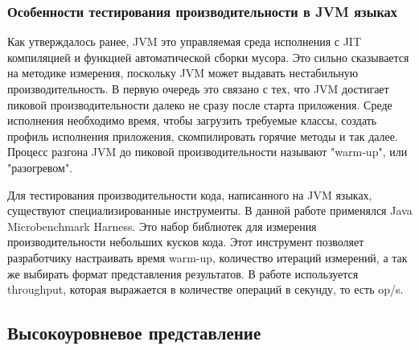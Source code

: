\subsubsection{Особенности тестирования производительности в JVM языках}
Как утверждалось ранее, JVM это управляемая среда исполнения с JIT компиляцией и функцией автоматической сборки мусора. Это сильно сказывается на методике измерения, поскольку JVM может выдавать нестабильную производительность. 
В первую очередь это связано с тех, что JVM достигает пиковой производительности далеко не сразу после старта приложения. Среде исполнения необходимо время, чтобы загрузить требуемые классы, создать профиль исполнения приложения, скомпилировать горячие методы и так далее.
Процесс разгона JVM до пиковой производительности называют "warm-up", или "разогревом".
\par
Для тестирования производительности кода, написанного на JVM языках, существуют специализированные инструменты. 
В данной работе применялся Java Microbenchmark Harness\cite{jmh}. Это набор библиотек для измерения производительности небольших кусков кода.
Этот инструмент позволяет разработчику настраивать время warm-up, количество итераций измерений, а так же выбирать формат представления результатов. 
В работе используется throughput, которая выражается в количестве операций в секунду, то есть op/s. 

\subsection{Высокоуровневое представление}

